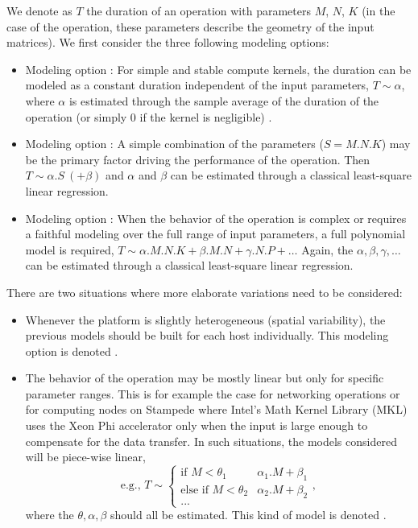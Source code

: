         We denote as \(T\) the duration of an operation with parameters \(M\), \(N\), \(K\) (in the case of the
        \dgemm operation, these parameters describe the geometry of the input matrices). We first consider the
        three following modeling options:
        \begin{itemize}
            \item Modeling option : For simple and stable compute kernels, the duration can be modeled as a
                constant duration independent of the input parameters, \ie \(T \sim \alpha\), where \(\alpha\) is
                estimated through the sample average of the duration of the operation (or simply 0 if the kernel is
                negligible) .
            \item Modeling option : A simple combination of the parameters (\eg \(S=M.N.K\)) may be the primary
                factor driving the performance of the operation. Then \(T \sim \alpha.S ~(+ \beta)\) and \(\alpha\) and
                \(\beta\) can be estimated through a classical least-square linear regression.
            \item Modeling option : When the behavior of the operation is complex or requires a faithful
                modeling over the full range of input parameters, a full polynomial model is required, \ie \(T \sim
                \alpha.M.N.K + \beta.M.N + \gamma.N.P + \dots \) Again, the \(\alpha,\beta,\gamma,\dots\) can be
                estimated through a classical least-square linear regression.
        \end{itemize}
        There are two situations where more elaborate variations need to be considered:
        \begin{itemize}
            \item Whenever the platform is slightly heterogeneous (spatial variability), the previous models should be
                built for each host individually. This modeling option is denoted \model[H]{}.
            \item The behavior of the operation may be mostly linear but only for specific parameter ranges. This is for
                example the case for networking operations or for computing nodes on Stampede where Intel's Math Kernel
                Library (MKL) uses the Xeon Phi accelerator only when the input is large enough to compensate for the
                data transfer. In such situations, the models considered will be piece-wise linear, \[\text{e.g., }T
                    \sim \begin{cases} \text{if } M<\theta_1 & \alpha_1.M+\beta_1 \\ \text{else if } M<\theta_2 &
                    \alpha_2.M+\beta_2 \\ ... \end{cases},\] where the \(\theta, \alpha, \beta\) should all be
                    estimated. This kind of model is denoted \modelp{}.
        \end{itemize}
